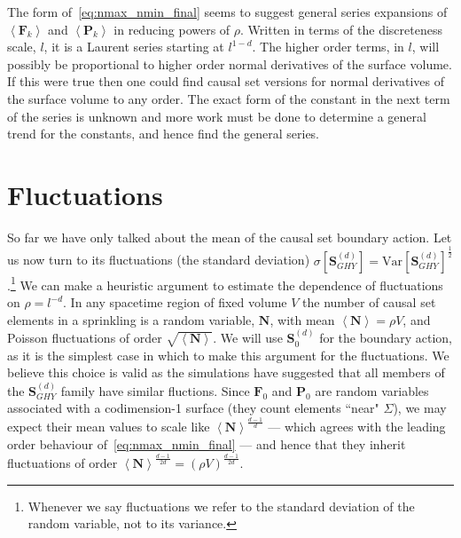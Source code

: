 \documentclass[12pt]{article}
\newcommand{\BF}[1]{\mathbf{F}_{#1}}
\newcommand{\BP}[1]{\mathbf{P}_{#1}}
\begin{document}
The form of~\eqref{eq:nmax_nmin_final} seems to suggest general series expansions of $\left\langle \BF{k}\right\rangle$ and $\left\langle \BP{k}\right\rangle$ in reducing powers of $\rho$. Written in terms of the discreteness scale, $l$, it is a Laurent series starting at $l^{1-d}$. The higher order terms, in $l$, will possibly be proportional to higher order normal derivatives of the surface volume. If this were true then one could find causal set versions for normal derivatives of the surface volume to any order. The exact form of the constant in the next term of the series is unknown and more work must be done to determine a general trend for the constants, and hence find the general series.

\section{Fluctuations}
So far we have only talked about the mean of the causal set boundary action. Let us now turn to its fluctuations (the standard deviation) $\sigma[\textbf{S}^{ (d)}_{GHY}]=\text{Var}[\textbf{S}^{ (d)}_{GHY}]^\frac12$.\footnote{Whenever we say fluctuations we refer to the standard deviation of the random variable, not to its variance.} We can make a heuristic argument to estimate the dependence of fluctuations on $\rho=l^{-d}$. In any spacetime region of fixed volume $V$ the number of causal set elements in a sprinkling is a random variable, $\textbf{N}$, with mean $\left\langle\textbf{N}\right\rangle=\rho V$, and Poisson fluctuations of order $\sqrt{\left\langle\textbf{N}\right\rangle}$. We will use $\textbf{S}^{ (d)}_{0}$ for the boundary action, as it is the simplest case in which to make this argument for the fluctuations. We believe this choice is valid as the simulations have suggested that all members of the $\textbf{S}^{ (d)}_{GHY}$ family have similar fluctions. Since $\BF{0}$ and $\BP{0}$ are random variables associated with a codimension-1 surface (they count elements ``near" $\Sigma$), we may expect their mean values to scale like $\left\langle\textbf{N}\right\rangle^\frac{d-1}{d}$ --- which agrees with the leading order behaviour of~\eqref{eq:nmax_nmin_final} --- and hence that they inherit fluctuations of order $\left\langle\textbf{N}\right\rangle^\frac{d-1}{2d} = (\rho V)^\frac{d-1}{2d}$. 
\end{document}
